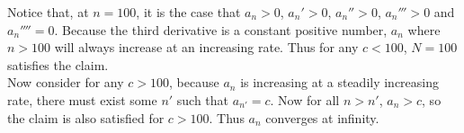 \documentclass[10pt]{article} %
\begin{document}
Notice that, at $n=100$, it is the case that $a_n >0$, $a_n' > 0$, $a_n'' > 0$, $a_n''' > 0$ and $a_n'''' = 0$. Because the third derivative is a constant positive number, $a_n$ where $n > 100$ will always increase at an increasing rate. Thus for any $c < 100$, $N = 100$ satisfies the claim.\\

Now consider for any $c > 100$, because $a_n$ is increasing at a steadily increasing rate, there must exist some $n'$ such that $a_{n'} = c$. Now for all $n > n'$, $a_n > c$, so the claim is also satisfied for $c > 100$. Thus $a_n$ converges at infinity.\\
\end{document}
